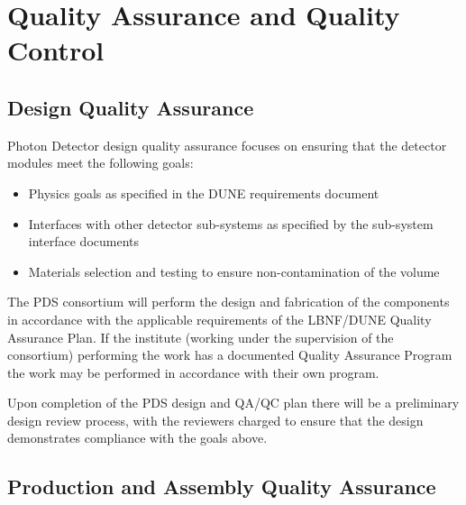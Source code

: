 \section{Quality Assurance and Quality Control}
\label{sec:fdsp-pd-qaqc}




\subsection{Design Quality Assurance}
\label{sec:fdsp-pd-designqa}

Photon Detector design quality assurance focuses on ensuring that the detector modules meet the following goals:
\begin{itemize}
\item Physics goals as specified in the DUNE requirements document
\item Interfaces with other detector sub-systems as specified by the sub-system interface documents
\item Materials selection and testing to ensure non-contamination of the \lar volume
\end{itemize}

The PDS consortium will perform the design and fabrication of the components in accordance with the applicable requirements of the LBNF/DUNE Quality Assurance Plan. If the institute (working under the supervision of the consortium) performing the work has a documented Quality Assurance Program the work may be performed in accordance with their own program.

Upon completion of the PDS design and QA/QC plan there will be a preliminary design review process, with the reviewers charged to ensure that the design demonstrates compliance with the goals above.

\subsection{Production and Assembly Quality Assurance}
\label{sec:fdsp-pd-prodqa}

